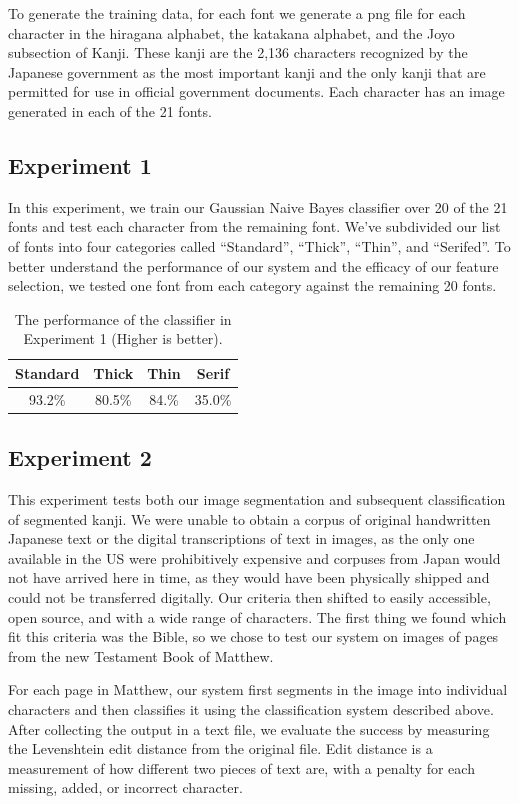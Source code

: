 \documentclass[10pt,twocolumn,letterpaper]{article}
\begin{document}
To generate the training data, for each font we generate a png file for each character in the hiragana alphabet, the katakana alphabet, and the Joyo subsection of Kanji. These kanji are the 2,136 characters recognized by the Japanese government as the most important kanji and the only kanji that are permitted for use in official government documents. Each character has an image generated in each of the 21 fonts.

\subsection{Experiment 1}
In this experiment, we train our Gaussian Naive Bayes classifier over 20 of the 21 fonts and test each character from the remaining font. We’ve subdivided our list of fonts into four categories called  ``Standard'', ``Thick'', ``Thin'', and ``Serifed''. To better understand the performance of our system and the efficacy of our feature selection, we tested one font from each category against the remaining 20 fonts.

\begin{table}
    \centering
    \begin{tabular}{|c|c|c|c|}
        \hline
        Standard & Thick & Thin & Serif \\
        \hline
        93.2\% & 80.5\% & 84.\% & 35.0\%\\
        \hline
    \end{tabular}
    \caption{The performance of the classifier in Experiment 1 (Higher is better).}
\end{table}

\subsection{Experiment 2}
This experiment tests both our image segmentation and subsequent classification of segmented kanji. We were unable to obtain a corpus of original handwritten Japanese text or the digital transcriptions of text in images, as the only one available in the US were prohibitively expensive and corpuses from Japan would not have arrived here in time, as they would have been physically shipped and could not be transferred digitally. Our criteria then shifted to easily accessible, open source, and with a wide range of characters. The first thing we found which fit this criteria was the Bible, so we chose to test our system on images of pages from the new Testament Book of Matthew.

For each page in Matthew, our system first segments in the image into individual characters and then classifies it using the classification system described above. After collecting the output in a text file, we evaluate the success by measuring the Levenshtein edit distance from the original file. Edit distance is a measurement of how different two pieces of text are, with a penalty for each missing, added, or incorrect character.
\end{document}
